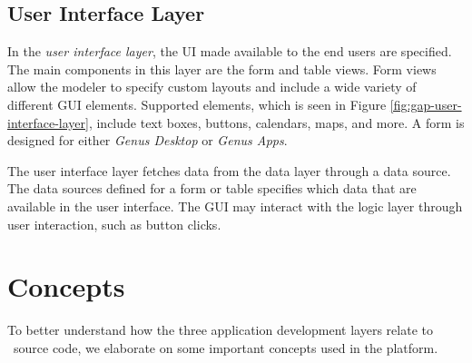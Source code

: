 
\subsection{User Interface Layer}
\label{sub:User Interface Layer}
In the \textit{user interface layer}, the UI made available to the end users are specified. The main components in this layer are the form and table views. Form views allow the modeler to specify custom layouts and include a wide variety of different GUI elements. Supported elements, which is seen in Figure \ref{fig:gap-user-interface-layer}, include text boxes, buttons, calendars, maps, and more. A form is designed for either \textit{Genus Desktop} or \textit{Genus Apps}. 

The user interface layer fetches data from the data layer through a data source. The data sources defined for a form or table specifies which data that are available in the user interface. The GUI may interact with the logic layer through user interaction, such as button clicks. 

\section{Concepts}
\label{sec:Concepts}
To better understand how the three application development layers relate to \gap~source code, we elaborate on some important concepts used in the platform.

